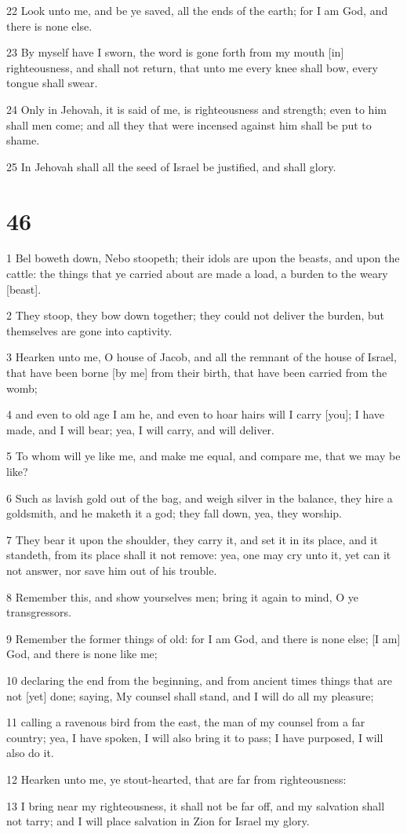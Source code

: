 \par 22 Look unto me, and be ye saved, all the ends of the earth; for I am God, and there is none else.
\par 23 By myself have I sworn, the word is gone forth from my mouth [in] righteousness, and shall not return, that unto me every knee shall bow, every tongue shall swear.
\par 24 Only in Jehovah, it is said of me, is righteousness and strength; even to him shall men come; and all they that were incensed against him shall be put to shame.
\par 25 In Jehovah shall all the seed of Israel be justified, and shall glory.

\chapter{46}

\par 1 Bel boweth down, Nebo stoopeth; their idols are upon the beasts, and upon the cattle: the things that ye carried about are made a load, a burden to the weary [beast].
\par 2 They stoop, they bow down together; they could not deliver the burden, but themselves are gone into captivity.
\par 3 Hearken unto me, O house of Jacob, and all the remnant of the house of Israel, that have been borne [by me] from their birth, that have been carried from the womb;
\par 4 and even to old age I am he, and even to hoar hairs will I carry [you]; I have made, and I will bear; yea, I will carry, and will deliver.
\par 5 To whom will ye like me, and make me equal, and compare me, that we may be like?
\par 6 Such as lavish gold out of the bag, and weigh silver in the balance, they hire a goldsmith, and he maketh it a god; they fall down, yea, they worship.
\par 7 They bear it upon the shoulder, they carry it, and set it in its place, and it standeth, from its place shall it not remove: yea, one may cry unto it, yet can it not answer, nor save him out of his trouble.
\par 8 Remember this, and show yourselves men; bring it again to mind, O ye transgressors.
\par 9 Remember the former things of old: for I am God, and there is none else; [I am] God, and there is none like me;
\par 10 declaring the end from the beginning, and from ancient times things that are not [yet] done; saying, My counsel shall stand, and I will do all my pleasure;
\par 11 calling a ravenous bird from the east, the man of my counsel from a far country; yea, I have spoken, I will also bring it to pass; I have purposed, I will also do it.
\par 12 Hearken unto me, ye stout-hearted, that are far from righteousness:
\par 13 I bring near my righteousness, it shall not be far off, and my salvation shall not tarry; and I will place salvation in Zion for Israel my glory.

